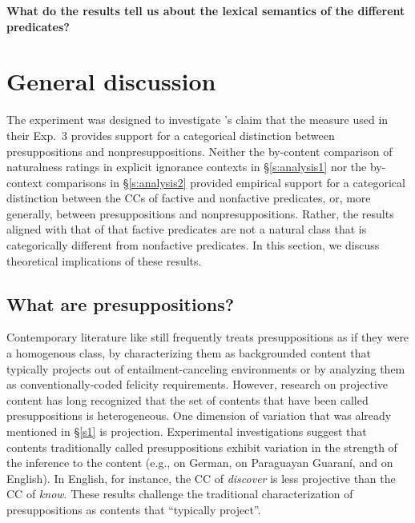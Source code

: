 \documentclass[11pt,fleqn]{article}
\newcommand{\6}{\mbox{$[\hspace*{-.6mm}[$}}
\newcommand{\9}{\mbox{$]\hspace*{-.6mm}]$}}
\newcommand{\citepos}[1]{\citeauthor{#1}'s \citeyear{#1}}
\begin{document}
{\bf What do the results tell us about the lexical semantics of the different predicates?}
  
\section{General discussion}\label{s3}

The experiment was designed to investigate \citepos{mandelkern-etal2020} claim that the measure used in their Exp.~3 provides support for a categorical distinction between presuppositions and nonpresuppositions. Neither the by-content comparison of naturalness ratings in explicit ignorance contexts  in \S\ref{s:analysis1} nor the by-context comparisons in \S\ref{s:analysis2} provided empirical support for a categorical distinction between the CCs of factive and nonfactive predicates, or, more generally, between presuppositions and nonpresuppositions. Rather, the results aligned with that of \citealt{degen-tonhauser-language} that factive predicates are not a natural class that is categorically different from nonfactive predicates. In this section, we discuss theoretical implications of these results.

\subsection{What are presuppositions?}

Contemporary literature like \citealt{mandelkern-etal2020} still frequently treats presuppositions as if they were a homogenous class, by characterizing them as backgrounded content that typically projects out of entailment-canceling environments or by analyzing them as conventionally-coded felicity requirements. However, research on projective content has long recognized that the set of contents that have been called presuppositions is heterogeneous. One dimension of variation that was already mentioned in \S\ref{s1} is projection. Experimental investigations suggest that contents traditionally called presuppositions exhibit variation in the strength of the inference to the content (e.g., \citealt{xue-onea11} on German, \citealt{tonhauser-guarani-variability} on Paraguayan Guaran\'i, and \citealt{demarneffe-etal-sub23,tbd-variability,degen-tonhauser-language} on English). In English, for instance, the CC of {\em discover} is less projective than the CC of {\em know}. These results challenge the traditional characterization of presuppositions as contents that ``typically project''.
\end{document}
